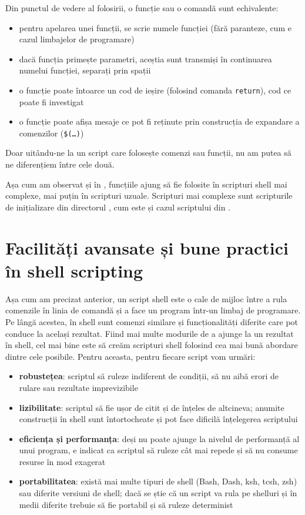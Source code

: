 Din punctul de vedere al folosirii, o funcție sau o comandă sunt echivalente:
\begin{itemize}
  \item pentru apelarea unei funcții, se scrie numele funcției (fără paranteze, cum e cazul limbajelor de programare)
  \item dacă funcția primește parametri, aceștia sunt transmiși în continuarea numelui funcției, separați prin spații
  \item o funcție poate întoarce un cod de ieșire (folosind comanda \texttt{return}), cod ce poate fi investigat
  \item o funcție poate afișa mesaje ce pot fi reținute prin construcția de expandare a comenzilor (\texttt{\$(\ldots)})
\end{itemize}
Doar uitându-ne la un script care folosește comenzi sau funcții, nu am putea să ne diferențiem între cele două.

Așa cum am observat și în , funcțiile ajung să fie folosite în scripturi shell mai complexe, mai puțin în scripturi uzuale.
Scripturi mai complexe sunt scripturile de inițializare din directorul , cum este și cazul scriptului  din .

\section{Facilități avansate și bune practici în shell scripting}
\label{sec:auto:script-advanced}

Așa cum am precizat anterior, un script shell este o cale de mijloc între a rula comenzile în linia de comandă și a face un program într-un limbaj de programare.
Pe lângă acestea, în shell sunt comenzi similare și funcționalități diferite care pot conduce la același rezultat.
Fiind mai multe modurile de a ajunge la un rezultat în shell, cel mai bine este să creăm scripturi shell folosind cea mai bună abordare dintre cele posibile.
Pentru aceasta, pentru fiecare script vom urmări:

\begin{itemize}
  \item \textbf{robustețea}: scriptul să ruleze indiferent de condiții, să nu aibă erori de rulare sau rezultate imprevizibile
  \item \textbf{lizibilitate}: scriptul să fie ușor de citit și de înțeles de altcineva;
    anumite construcții în shell sunt întortocheate și pot face dificilă înțelegerea scriptului
  \item \textbf{eficiența și performanța}: deși nu poate ajunge la nivelul de performanță al unui program, e indicat ca scriptul să ruleze cât mai repede și să nu consume resurse în mod exagerat
  \item \textbf{portabilitatea}: există mai multe tipuri de shell (Bash, Dash, ksh, tcsh, zsh) sau diferite versiuni de shell;
    dacă se știe că un script va rula pe shelluri și în medii diferite trebuie să fie portabil și să ruleze determinist
\end{itemize}

